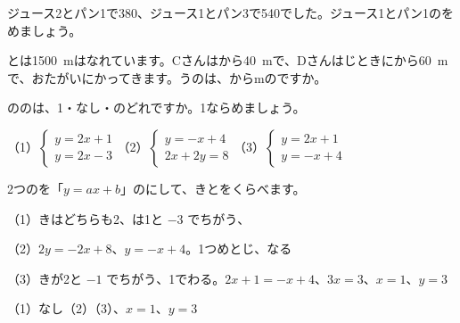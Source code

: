 \begingroup{}%
\noindent\begin{minipage}[t]{0.49\linewidth}
\begin{jibun}\raggedright
ジュース2とパン1で380、ジュース1とパン3で540でした。ジュース1とパン1のをめましょう。
\end{jibun}
\end{minipage}\hfill
\begin{minipage}[t]{0.49\linewidth}
\begin{jibun}\raggedright
{}とは\qty{1500}{m}はなれています。Cさんはから\qty{40}{m}で、Dさんはじときにから\qty{60}{m}で、おたがいにかってきます。うのは、からmのですか。
\end{jibun}
\end{minipage}\par
\endgroup

\begin{reidai}[\R{解}{かい}はいくつ？]
ののは、1・なし・のどれですか。1ならめましょう。\par
（1）\nobreak $\begin{cases} y=2x+1\\ y=2x-3 \end{cases}$\quad（2）\nobreak $\begin{cases} y=-x+4\\ 2x+2y=8 \end{cases}$\quad（3）\nobreak $\begin{cases} y=2x+1\\ y=-x+4 \end{cases}$\par
\kangaekata 2つのを「$y=ax+b$」のにして、きとをくらべます。\par
\shiki（1）\nobreak {}きはどちらも2、は1と $-3$ でちがう、\par
\hspace*{2.6\zw}（2）\nobreak $2y=-2x+8$、$y=-x+4$。1つめとじ、なる\par
\hspace*{2.6\zw}（3）\nobreak {}きが2と $-1$ でちがう、1でわる。$2x+1=-x+4$、$3x=3$、$x=1$、$y=3$\par
\kotae（1）\nobreak なし\quad（2）\nobreak {}\quad（3）、$x=1$、$y=3$
\end{reidai}

